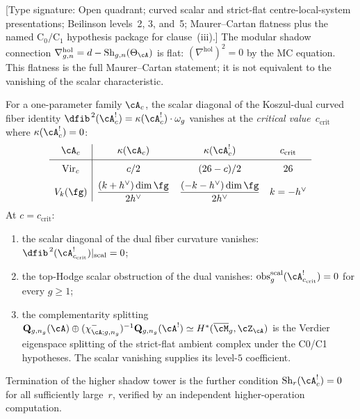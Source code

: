 \begin{theorem}
\label{thm:critical-dimension}
\textup{[Type signature: Open quadrant; curved scalar and strict-flat
centre-local-system presentations; Beilinson levels~2, 3, and~5;
Maurer--Cartan flatness plus the named \(\mathrm C_0/\mathrm C_1\)
hypothesis package for clause~\textup{(iii)}.]}
The modular shadow connection
$\nabla^{\mathrm{hol}}_{g,n} =
d - \operatorname{Sh}_{g,n}(\Theta_\cA)$
is flat: $(\nabla^{\mathrm{hol}})^2 = 0$ by the MC equation. This
flatness is the full Maurer--Cartan statement; it is not equivalent
to the vanishing of the scalar characteristic.

For a one-parameter family $\cA_c$, the scalar diagonal of the
Koszul-dual curved fiber identity
$\dfib^{\,2}(\cA_c^!) = \kappa(\cA_c^!) \cdot \omega_g$
vanishes at the \emph{critical value}~$c_{\mathrm{crit}}$
where $\kappa(\cA_c^!) = 0$:
\begin{equation}\label{eq:critical-dimension-table}
\begin{array}{c|ccc}
\cA_c & \kappa(\cA_c) & \kappa(\cA_c^!)
 & c_{\mathrm{crit}}
\\[3pt]\hline
\rule{0pt}{12pt}
\mathrm{Vir}_c & c/2 & (26 - c)/2 & 26
\\[6pt]
V_k(\fg) &
 \dfrac{(k+h^\vee)\dim\fg}{2h^\vee}
 & \dfrac{(-k-h^\vee)\dim\fg}{2h^\vee}
 & k = -h^\vee
\end{array}
\end{equation}
At $c = c_{\mathrm{crit}}$:
\begin{enumerate}[label=\textup{(\roman*)}]
\item the scalar diagonal of the dual fiber curvature vanishes:
 $\dfib^{\,2}(\cA_{c_{\mathrm{crit}}}^!)|_{\mathrm{scal}}=0$;
\item the top-Hodge scalar obstruction of the dual vanishes:
 $\operatorname{obs}^{\mathrm{scal}}_g(\cA_{c_{\mathrm{crit}}}^!)
 =0$ for every $g\geq1$;
\item the complementarity splitting
 $\mathbf{Q}_{g,n_g}(\cA)\oplus
 (\chi^-_{\cA;g,n_g})^{-1}\mathbf{Q}_{g,n_g}(\cA^!)
 \simeq H^*(\overline{\cM}_g, \cZ_\cA)$
 is the Verdier eigenspace splitting of the strict-flat ambient
 complex under the C0/C1 hypotheses.  The scalar vanishing supplies
 its level-$5$ coefficient.
\end{enumerate}
Termination of the higher shadow tower is the further condition
$\operatorname{Sh}_r(\cA_c^!)=0$ for all sufficiently large~$r$,
verified by an independent higher-operation computation.
\end{theorem}


